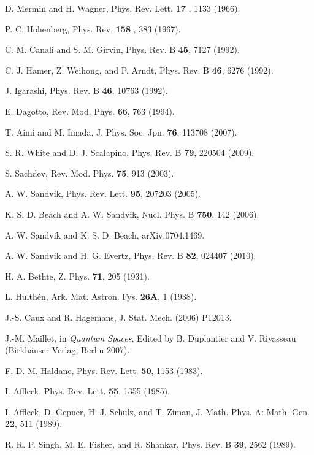 \documentclass[draft,numberedheadings]{aipproc}
\begin{document}
\begin{thebibliography}{999}
D. Mermin and H. Wagner, Phys. Rev. Lett. {\bf 17} , 1133 (1966).

P. C. Hohenberg, Phys. Rev. {\bf 158} , 383 (1967).

C. M. Canali and S. M. Girvin, Phys. Rev. B {\bf 45}, 7127 (1992).

C. J. Hamer, Z. Weihong, and P. Arndt, Phys. Rev. B {\bf 46}, 6276 (1992).

J. Igarashi, Phys. Rev. B {\bf 46}, 10763 (1992).

E. Dagotto, Rev. Mod. Phys. {\bf 66}, 763  (1994). 

T. Aimi and M. Imada, J. Phys. Soc. Jpn. {\bf 76}, 113708 (2007).

S. R. White and D. J. Scalapino, Phys. Rev. B {\bf 79}, 220504 (2009).

S. Sachdev, Rev. Mod. Phys. {\bf 75}, 913 (2003). 

A. W. Sandvik, Phys. Rev. Lett. {\bf 95}, 207203 (2005). 

K. S. D. Beach and  A. W. Sandvik, Nucl. Phys. B {\bf 750}, 142 (2006). 

A. W. Sandvik and K. S. D. Beach, arXiv:0704.1469.

A. W. Sandvik and H. G. Evertz, Phys. Rev. B {\bf 82}, 024407 (2010).

H. A. Bethte, Z. Phys. {\bf 71}, 205 (1931).

L. Hulth\'en, Ark. Mat. Astron. Fys. {\bf 26A}, 1 (1938).

J.-S. Caux and R. Hagemans, J. Stat. Mech. (2006) P12013.

J.-M. Maillet, in {\it Quantum Spaces}, Edited by B. Duplantier and V. Rivasseau 
(Birkh\"auser Verlag, Berlin 2007).

F. D. M. Haldane, Phys. Rev. Lett. {\bf 50}, 1153 (1983).

I. Affleck, Phys. Rev. Lett. {\bf 55}, 1355 (1985). 

I. Affleck, D. Gepner, H. J. Schulz, and T. Ziman, J. Math. Phys. A: Math. Gen. {\bf 22}, 511 (1989).

R. R. P. Singh, M. E. Fisher, and R. Shankar, Phys. Rev. B {\bf 39}, 2562 (1989).


\end{thebibliography}
\end{document}
